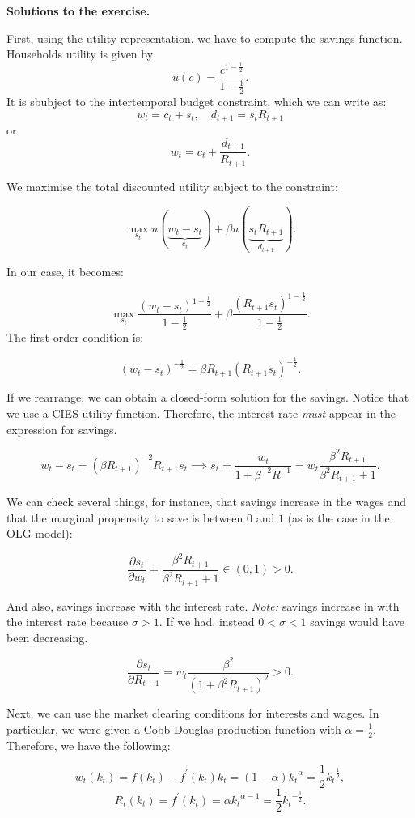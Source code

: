 \documentclass[11pt,twoside,a4paper]{article}
\begin{document}
\textbf{Solutions to the exercise.}

First, using the utility representation, we have to compute the savings function.
Households utility is given by 
$$u(c)=\frac{c^{1-\frac{1}{2}}}{1-\frac{1}{2}}.$$
It is sbubject to the intertemporal budget constraint, which we can write as:
$$w_t = c_t + s_t, \quad d_{t+1} = s_{t} R_{t+1}$$
or
$$w_{t} = c_{t} + \frac{d_{t+1}}{R_{t+1}}.$$

We maximise the total discounted utility subject to the constraint:

$$\max_{s_{t}} u(\underbrace{w_{t}-s_{t}}_{c_{t}}) + \beta u(\underbrace{s_{t}R_{t+1}}_{d_{t+1}}).$$

In our case, it becomes:

$$\max_{s_t} \frac{(w_{t}-s_{t})^{1-\frac{1}{2}}}{1-\frac{1}{2}} + \beta \frac{(R_{t+1}s_{t})^{1-\frac{1}{2}}}{1-\frac{1}{2}}.$$
The first order condition is:

$$(w_{t}-s_{t})^{-\frac{1}{2}} = \beta R_{t+1} (R_{t+1}s_{t})^{-\frac{1}{2}}.$$

If we rearrange, we can obtain a closed-form solution for the savings.
Notice that we use a CIES utility function.
Therefore, the interest rate \emph{must} appear in the expression for savings.

$$w_t - s_t = (\beta R_{t+1})^{-2} R_{t+1}s_t \implies s_t = \frac{w_t}{1+\beta^{-2}R^{-1}}=w_t \frac{\beta^2 R_{t+1}}{\beta^2 R_{t+1} +1 }.$$

We can check several things, for instance, that savings increase in the wages and that the marginal propensity to save is between $0$ and $1$ (as is the case in the OLG model):

$$\frac{\partial s_t}{\partial w_t} = \frac{\beta^2 R_{t+1}}{\beta^2 R_{t+1} + 1} \in (0,1) > 0.$$

And also, savings increase with the interest rate.
\emph{Note:} savings increase in with the interest rate because $\sigma > 1.$ If we had, instead $0 < \sigma < 1$ savings would have been decreasing.

$$\frac{\partial s_t}{\partial R_{t+1}} = w_{t}\frac{\beta^2}{(1+\beta^2 R_{t+1})^2} > 0.$$

Next, we can use the market clearing conditions for interests and wages.
In particular, we were given a Cobb-Douglas production function with $\alpha=\frac{1}{2}.$
Therefore, we have the following:

$$w_t(k_t) = f(k_t) - f^\prime (k_t)k_t = (1 - \alpha) {k_t}^\alpha = \frac{1}{2} {k_t}^\frac{1}{2},$$
$$R_t(k_t) = f^\prime (k_t) = \alpha {k_t}^{\alpha-1} = \frac{1}{2} {k_t}^{-\frac{1}{2}}.$$
\end{document}
